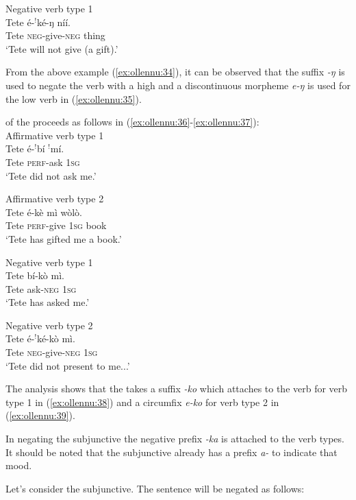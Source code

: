 \documentclass[output=paper,newtxmath,modfonts,nonflat,hidelinks]{langsci/langscibook}
\begin{document}
\ea Negative verb type 1 \\ \label{ex:ollennu:35}
\gll Tete é-$^{!}$ké-ŋ níí.\\
Tete \textsc{neg}-give-\textsc{neg} thing\\
\glt `Tete will not give (a gift).'\\
\z

From the above example (\ref{ex:ollennu:34}), it can be observed that the suffix \textit{-ŋ} is used to negate the verb with a high  and a discontinuous morpheme \textit{e-ŋ} is used for the low  verb in (\ref{ex:ollennu:35}).

 of the  proceeds as follows in (\ref{ex:ollennu:36}-\ref{ex:ollennu:37}):\\

\ea Affirmative verb type 1 \\\label{ex:ollennu:36}
\gll Tete é-$^{!}$bí $^{!}$mí.\\
Tete \textsc{perf}-ask 1\textsc{sg}\\
\glt `Tete did not ask me.'
\z


\ea Affirmative verb type 2 \\ \label{ex:ollennu:37}
\gll Tete é-kè mì wòlò.\\
Tete \textsc{perf}-give 1\textsc{sg} book\\
\glt `Tete has gifted me a book.'
\z


\ea Negative verb type 1 \\ \label{ex:ollennu:38}
\gll Tete bí-kò mì.\\
Tete ask-\textsc{neg} 1\textsc{sg}\\
\glt `Tete has asked me.'
\z


\ea Negative verb type 2 \\  \label{ex:ollennu:39}
 \gll Tete é-$^{!}$ké-kò mì.\\
Tete \textsc{neg}-give-\textsc{neg} 1\textsc{sg}\\
\glt `Tete did not present to me...'
\z
 
The analysis shows that the  takes a suffix \textit{-ko} which attaches to the verb for verb type 1 in (\ref{ex:ollennu:38}) and a circumfix \textit{e-ko} for verb type 2 in (\ref{ex:ollennu:39}).

In negating the subjunctive the negative prefix \textit{-ka} is attached to the verb types. It should be noted that the subjunctive already has a prefix \textit{a-} to indicate that mood.

Let’s consider the subjunctive. The sentence will be negated as follows:\\
\end{document}
